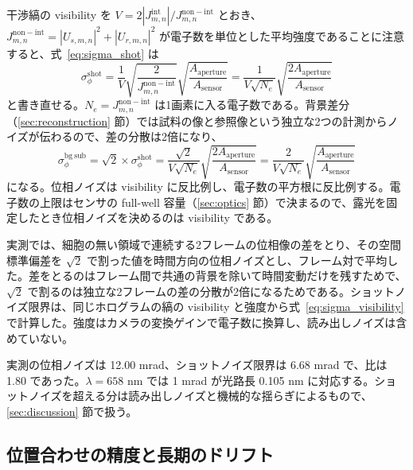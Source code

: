 干渉縞の visibility を $V = 2|J_{m,n}^{\mathrm{int}}|/J_{m,n}^{\mathrm{non-int}}$ とおき、$J_{m,n}^{\mathrm{non-int}} = |U_{s,m,n}|^2 + |U_{r,m,n}|^2$ が電子数を単位とした平均強度であることに注意すると、式~\eqref{eq:sigma_shot} は
\begin{equation}
\label{eq:sigma_visibility}
\sigma_{\phi}^{\mathrm{shot}} = \frac{1}{V} \sqrt{\frac{2}{J_{m,n}^{\mathrm{non-int}}}} \sqrt{\frac{A_{\mathrm{aperture}}}{A_{\mathrm{sensor}}}} = \frac{1}{V\sqrt{N_e}} \sqrt{\frac{2A_{\mathrm{aperture}}}{A_{\mathrm{sensor}}}}
\end{equation}
と書き直せる。$N_e = J_{m,n}^{\mathrm{non-int}}$ は1画素に入る電子数である。背景差分（\ref{sec:reconstruction} 節）では試料の像と参照像という独立な2つの計測からノイズが伝わるので、差の分散は2倍になり、
\begin{equation}
\label{eq:sigma_bgsub}
\sigma_{\phi}^{\mathrm{bg\ sub}} = \sqrt{2} \times \sigma_{\phi}^{\mathrm{shot}} = \frac{\sqrt{2}}{V\sqrt{N_e}} \sqrt{\frac{2A_{\mathrm{aperture}}}{A_{\mathrm{sensor}}}} = \frac{2}{V\sqrt{N_e}} \sqrt{\frac{A_{\mathrm{aperture}}}{A_{\mathrm{sensor}}}}
\end{equation}
になる。位相ノイズは visibility に反比例し、電子数の平方根に反比例する。電子数の上限はセンサの full-well 容量（\ref{sec:optics} 節）で決まるので、露光を固定したとき位相ノイズを決めるのは visibility である。

実測では、細胞の無い領域で連続する2フレームの位相像の差をとり、その空間標準偏差を $\sqrt{2}$ で割った値を時間方向の位相ノイズとし、フレーム対で平均した。差をとるのはフレーム間で共通の背景を除いて時間変動だけを残すためで、$\sqrt{2}$ で割るのは独立な2フレームの差の分散が2倍になるためである。ショットノイズ限界は、同じホログラムの縞の visibility と強度から式~\eqref{eq:sigma_visibility} で計算した。強度はカメラの変換ゲインで電子数に換算し、読み出しノイズは含めていない。

実測の位相ノイズは 12.00 mrad、ショットノイズ限界は 6.68 mrad で、比は 1.80 であった。$\lambda = 658$ nm では 1 mrad が光路長 0.105 nm に対応する。ショットノイズを超える分は読み出しノイズと機械的な揺らぎによるもので、\ref{sec:discussion} 節で扱う。

\subsection{位置合わせの精度と長期のドリフト}

